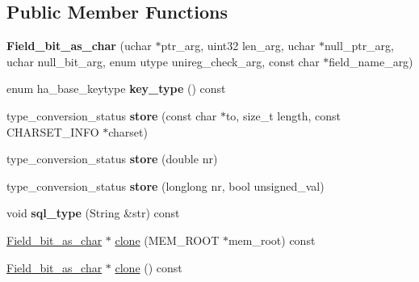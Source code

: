 \subsection*{Public Member Functions}
\begin{DoxyCompactItemize}
\item 
\mbox{\label{classField__bit__as__char_a15e0f78df37bb83bc544000dcfb8a038}} 
{\bfseries Field\+\_\+bit\+\_\+as\+\_\+char} (uchar $\ast$ptr\+\_\+arg, uint32 len\+\_\+arg, uchar $\ast$null\+\_\+ptr\+\_\+arg, uchar null\+\_\+bit\+\_\+arg, enum utype unireg\+\_\+check\+\_\+arg, const char $\ast$field\+\_\+name\+\_\+arg)
\item 
\mbox{\label{classField__bit__as__char_a3c6d0133a943af816e4cee0f19300481}} 
enum ha\+\_\+base\+\_\+keytype {\bfseries key\+\_\+type} () const
\item 
\mbox{\label{classField__bit__as__char_a28d18e5be5999cc02d6b39d899825c3a}} 
type\+\_\+conversion\+\_\+status {\bfseries store} (const char $\ast$to, size\+\_\+t length, const C\+H\+A\+R\+S\+E\+T\+\_\+\+I\+N\+FO $\ast$charset)
\item 
\mbox{\label{classField__bit__as__char_af7072e8c816cbdb87449ba66421a1bf6}} 
type\+\_\+conversion\+\_\+status {\bfseries store} (double nr)
\item 
\mbox{\label{classField__bit__as__char_a0874a0ea85b7d077bd203bcbd920b7e6}} 
type\+\_\+conversion\+\_\+status {\bfseries store} (longlong nr, bool unsigned\+\_\+val)
\item 
\mbox{\label{classField__bit__as__char_a08898aae417eb7e092b75b24009cdfb0}} 
void {\bfseries sql\+\_\+type} (String \&str) const
\item 
\mbox{\hyperlink{classField__bit__as__char}{Field\+\_\+bit\+\_\+as\+\_\+char}} $\ast$ \mbox{\hyperlink{classField__bit__as__char_ad4db0c25fbc5074baf6793daabfe5447}{clone}} (M\+E\+M\+\_\+\+R\+O\+OT $\ast$mem\+\_\+root) const
\item 
\mbox{\hyperlink{classField__bit__as__char}{Field\+\_\+bit\+\_\+as\+\_\+char}} $\ast$ \mbox{\hyperlink{classField__bit__as__char_a03166b5ed4492fcb071fd377c4c5e1b8}{clone}} () const
\end{DoxyCompactItemize}
